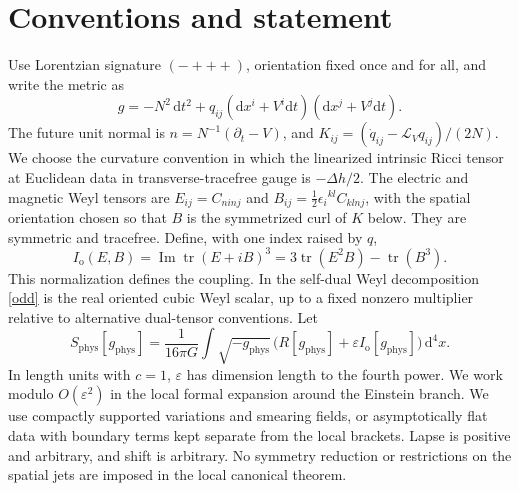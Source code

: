 \documentclass[11pt]{article}
\newcommand{\Lie}{\mathcal L}
\newcommand{\tr}{\operatorname{tr}}
\newcommand{\dd}{\mathrm d}
\newcommand{\PG}{16\pi G}
\newcommand{\ep}{\varepsilon}
\begin{document}
\section{Conventions and statement}
Use Lorentzian signature \((-+++)\), orientation fixed once and for all, and write the metric as
\[
 g=-N^2\,\dd t^2+q_{ij}(\dd x^i+V^i\dd t)(\dd x^j+V^j\dd t).
\]
The future unit normal is \(n=N^{-1}(\partial_t-V)\), and
\(K_{ij}=(\dot q_{ij}-\Lie_Vq_{ij})/(2N)\).
We choose the curvature convention in which the linearized intrinsic Ricci tensor at Euclidean data in transverse-tracefree gauge is \(-\Delta h/2\). The electric and magnetic Weyl tensors are
\(E_{ij}=C_{ninj}\) and \(B_{ij}=\tfrac12\epsilon_i{}^{kl}C_{kl n j}\), with the spatial orientation chosen so that \(B\) is the symmetrized curl of \(K\) below. They are symmetric and tracefree. Define, with one index raised by \(q\),
\begin{equation}
 I_{\mathrm o}(E,B)=\operatorname{Im}\tr(E+iB)^3
             =3\tr(E^2B)-\tr(B^3).
 \label{odd}
\end{equation}
This normalization defines the coupling. In the self-dual Weyl decomposition \eqref{odd} is the real oriented cubic Weyl scalar, up to a fixed nonzero multiplier relative to alternative dual-tensor conventions. Let
\begin{equation}
 S_{\mathrm{phys}}[g_{\mathrm{phys}}]
   =\frac{1}{\PG}\int \sqrt{-g_{\mathrm{phys}}}\,
       \bigl(R[g_{\mathrm{phys}}]+\ep I_{\mathrm o}[g_{\mathrm{phys}}]\bigr)\,\dd^4 x.
 \label{physaction}
\end{equation}
In length units with \(c=1\), \(\ep\) has dimension length to the fourth power. We work modulo \(O(\ep^2)\) in the local formal expansion around the Einstein branch. We use compactly supported variations and smearing fields, or asymptotically flat data with boundary terms kept separate from the local brackets. Lapse is positive and arbitrary, and shift is arbitrary. No symmetry reduction or restrictions on the spatial jets are imposed in the local canonical theorem.
\end{document}

